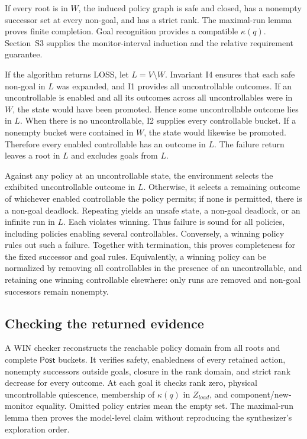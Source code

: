\documentclass[11pt]{article}
\newcommand{\Post}{\mathsf{Post}}
\begin{document}
If every root is in $W$, the induced policy graph is safe and closed, has a nonempty successor set at every non-goal, and has a strict rank. The maximal-run lemma proves finite completion. Goal recognition provides a compatible $\kappa(q)$. Section~S3 supplies the monitor-interval induction and the relative requirement guarantee.

If the algorithm returns LOSS, let $L=V\setminus W$. Invariant I4 ensures that each safe non-goal in $L$ was expanded, and I1 provides all uncontrollable outcomes. If an uncontrollable is enabled and all its outcomes across all uncontrollables were in $W$, the state would have been promoted. Hence some uncontrollable outcome lies in $L$. When there is no uncontrollable, I2 supplies every controllable bucket. If a nonempty bucket were contained in $W$, the state would likewise be promoted. Therefore every enabled controllable has an outcome in $L$. The failure return leaves a root in $L$ and excludes goals from $L$.

Against any policy at an uncontrollable state, the environment selects the exhibited uncontrollable outcome in $L$. Otherwise, it selects a remaining outcome of whichever enabled controllable the policy permits; if none is permitted, there is a non-goal deadlock. Repeating yields an unsafe state, a non-goal deadlock, or an infinite run in $L$. Each violates winning. Thus failure is sound for all policies, including policies enabling several controllables. Conversely, a winning policy rules out such a failure. Together with termination, this proves completeness for the fixed successor and goal rules. Equivalently, a winning policy can be normalized by removing all controllables in the presence of an uncontrollable, and retaining one winning controllable elsewhere: only runs are removed and non-goal successors remain nonempty.

\subsection{Checking the returned evidence}
A WIN checker reconstructs the reachable policy domain from all roots and complete $\Post$ buckets. It verifies safety, enabledness of every retained action, nonempty successors outside goals, closure in the rank domain, and strict rank decrease for every outcome. At each goal it checks rank zero, physical uncontrollable quiescence, membership of $\kappa(q)$ in $Z_{load}$, and component/new-monitor equality. Omitted policy entries mean the empty set. The maximal-run lemma then proves the model-level claim without reproducing the synthesizer's exploration order.
\end{document}
